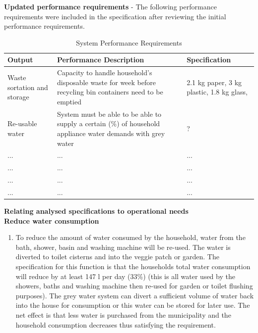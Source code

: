 \documentclass[a4paper,11pt,fleqn]{report}
\begin{document}
\noindent\textbf{Updated performance requirements} -
The following performance requirements were included in the specification after reviewing the initial performance requirements.\\

\begin{table}[h!]
\caption {System Performance Requirements} \label{tb: Functional_SS_elements} 
\begin{center}
\begin{tabular}{p{3cm}|p{6cm}|p{5.5cm}}\toprule
	{\textbf{Output}} & {\textbf{Performance Description}} & {\textbf{Specification}}\\ \midrule
    \hline
   Waste sortation and storage & Capacity to handle household's disposable waste for week before recycling bin containers need to be emptied  & 2.1 kg paper, 3 kg plastic, 1.8 kg glass, \citep{Sithole2014}\\
        \hline
    Re-usable water & System must be able to be able to supply a certain (\%) of household appliance water demands with grey water & ?\\
        \hline
    ... & ... & ...\\
        \hline
    ... & ... & ...\\
        \hline
    ... & ... & ...\\
        \hline
    ... & ... & ...\\

    \bottomrule
\end{tabular}
\end{center}
\end{table}

\noindent\textbf{Relating analysed specifications to operational needs}\\

\noindent\textbf{Reduce water consumption}
\begin{enumerate}
\item To reduce the amount of water consumed by the household, water from the bath, shower, basin and washing machine will be re-used. The water is diverted to toilet cisterns and into the veggie patch or garden. The specification for this function is that the households total water consumption will reduce by at least 147 l per day (33\%) (this is all water used by the showers, baths and washing machine then re-used for garden or toilet flushing purposes). The grey water system can divert a sufficient volume of water back into the house for consumption or this water can be stored for later use. The net effect is that less water is purchased from the municipality and the household consumption decreases thus satisfying the requirement.
\end{enumerate}
\end{document}
